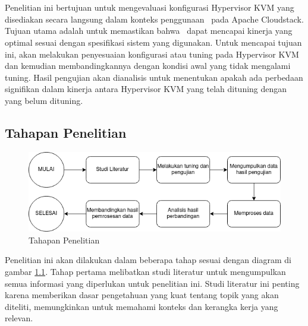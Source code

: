 \chapter{\babTiga}
Penelitian ini bertujuan untuk mengevaluasi konfigurasi Hypervisor KVM yang disediakan secara langsung dalam konteks penggunaan \vm\ pada Apache Cloudstack. Tujuan utama adalah untuk memastikan bahwa \vm\ dapat mencapai kinerja yang optimal sesuai dengan spesifikasi sistem yang digunakan. Untuk mencapai tujuan ini, \saya akan melakukan penyesuaian konfigurasi atau tuning pada Hypervisor KVM dan kemudian membandingkannya dengan kondisi awal yang tidak mengalami tuning. Hasil pengujian akan dianalisis untuk menentukan apakah ada perbedaan signifikan dalam kinerja antara Hypervisor KVM yang telah dituning dengan yang belum dituning.

\section{Tahapan Penelitian}
\begin{figure}
	\centering
	\includegraphics[width=1\textwidth]
	{assets/pics/tahapan-penelitian.png}
	\caption{Tahapan Penelitian}
	\label{fig:TahapanPenelitian}
\end{figure}

Penelitian ini akan dilakukan dalam beberapa tahap sesuai dengan diagram di gambar \ref{fig:TahapanPenelitian}. Tahap pertama melibatkan studi literatur untuk mengumpulkan semua informasi yang diperlukan untuk penelitian ini. Studi literatur ini penting karena memberikan dasar pengetahuan yang kuat tentang topik yang akan diteliti, memungkinkan \saya untuk memahami konteks dan kerangka kerja yang relevan.

